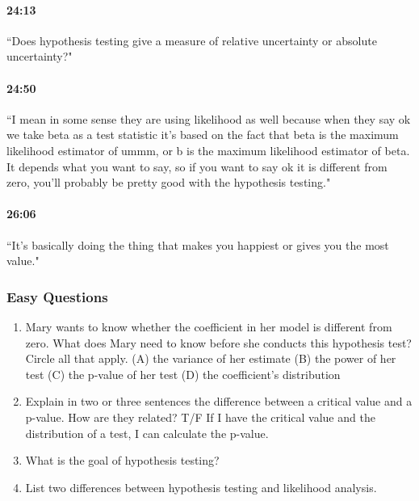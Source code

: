 \documentclass[11pt]{article}
\begin{document}
\paragraph{24:13} ``Does hypothesis testing give a measure of relative uncertainty or absolute uncertainty?"

\paragraph{24:50} ``I mean in some sense they are using likelihood as well because when they say ok we take beta as a test statistic it's based on the fact that beta is the maximum likelihood estimator of ummm, or b is the maximum likelihood estimator of beta.  It depends what you want to say, so if you want to say ok it is different from zero, you'll probably be pretty good with the hypothesis testing."

\paragraph{26:06} ``It's basically doing the thing that makes you happiest or gives you the most value."

\subsubsection{Easy Questions}
\begin{enumerate}
\item Mary wants to know whether the coefficient in her model is different from zero.  What does Mary need to know before she conducts this hypothesis test?  Circle all that apply.  (A) the variance of her estimate (B) the power of her test (C) the p-value of her test (D)  the coefficient's distribution 
\item Explain in two or three sentences the difference between a critical value and a p-value.  How are they related? T/F If I have the critical value and the distribution of a test, I can calculate the p-value. 
\item What is the goal of hypothesis testing?  
\item List two differences between hypothesis testing and likelihood analysis.  
\end{enumerate}
\end{document}
